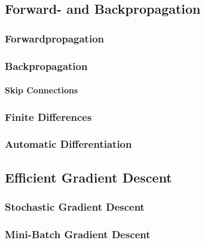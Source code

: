 		\subsection{Forward- and Backpropagation} %

			\subsubsection{Forwardpropagation} %

			\subsubsection{Backpropagation} %

				\paragraph{Skip Connections} %

			\subsubsection{Finite Differences} %

			\subsubsection{Automatic Differentiation} %

		\subsection{Efficient Gradient Descent} %

			\subsubsection{Stochastic Gradient Descent} %
				\label{subsubsec:sgd}


			\subsubsection{Mini-Batch Gradient Descent} %

